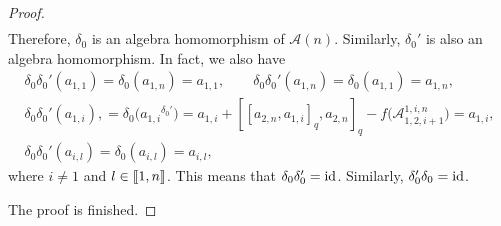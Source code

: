 \documentclass[pdftex]{sigma}
\numberwithin{equation}{section}
\def\lrb#1{\left(#1\right)}
\def\d{\delta}
\def\A{\mathscr{A}}
\def\lbb#1{\left[\kern-0.15em\left[ {#1} \right] \kern-0.15em\right]}
\begin{document}
\begin{proof}
\begin{gather*}
\end{gather*}
Therefore, $\d_0$ is an algebra homomorphism of $\A(n)$.
Similarly, $\d_0'$ is also an algebra homomorphism.
In fact, we also have
\begin{gather*}
\d_0\d_0'\lrb{a_{1,1}} = \d_0\lrb{a_{1,n}}=a_{1,1},\qquad
\d_0\d_0'\lrb{a_{1,n}} = \d_0\lrb{a_{1,1}}=a_{1,n},\\
\d_0\d_0'\lrb{a_{1,i}},
 = \d_0\bigl({a_{1,i}}^{\d_0'}\bigr)=a_{1,i}+[[a_{2,n}, a_{1,i}]_q, a_{2,n}]_q -f\bigl(\A_{1,2,i+1}^{1,i,n}\bigr)
=a_{1,i},\\
\d_0\d_0'\lrb{a_{i,l}} = \d_0\lrb{a_{i,l}}=a_{i,l},
\end{gather*}
where $i \neq 1$ and $l \in \lbb{1,n}$.
This means that $\d_0\d_0'={\rm id}$.
Similarly, $\d_0'\d_0={\rm id}$.

 The proof is finished.
\end{proof}
\end{document}

